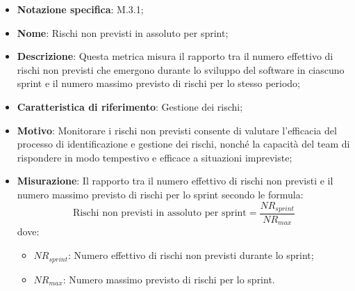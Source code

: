 \begin{itemize}
    \item \textbf{Notazione specifica}: M.3.1;
    \item \textbf{Nome}: Rischi non previsti in assoluto per sprint;
    \item \textbf{Descrizione}: Questa metrica misura il rapporto tra il numero effettivo di rischi non previsti che emergono durante lo sviluppo del software in ciascuno sprint e il numero massimo previsto di rischi per lo stesso periodo;
    \item \textbf{Caratteristica di riferimento}: Gestione dei rischi;
    \item \textbf{Motivo}: Monitorare i rischi non previsti consente di valutare l'efficacia del processo di identificazione e gestione dei rischi, nonché la capacità del team di rispondere in modo tempestivo e efficace a situazioni impreviste;
    \item \textbf{Misurazione}: Il rapporto tra il numero effettivo di rischi non previsti e il numero massimo previsto di rischi per lo sprint secondo le formula:
    \[
        \text{Rischi non previsti in assoluto per sprint} =\frac{NR_{sprint}}{NR_{max}} 
    \]
    dove:
    \begin{itemize}
        \item $NR_{sprint}$: Numero effettivo di rischi non previsti durante lo sprint;
        \item $NR_{max}$: Numero massimo previsto di rischi per lo sprint.
    \end{itemize}
\end{itemize}
